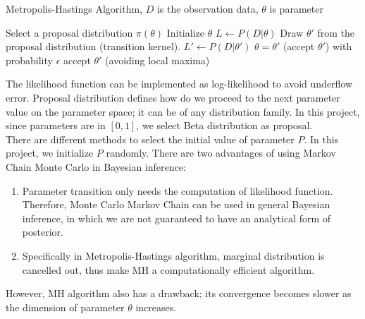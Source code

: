 \documentclass[12pt]{article}
\theoremstyle{definition}
\begin{document}
\begin{algorithm}[H]
  \caption{Metropolis-Hastings Algorithm, $D$ is the observation data, $\theta$ is parameter}\label{mhalg}
  \begin{algorithmic}[1]
    \State Select a proposal distribution $\pi(\theta)$
    \State Initialize $\theta$
    \State $L \leftarrow P(D|\theta)$
    \State Draw $\theta' $ from the proposal distribution (transition kernel).
    \State $L' \leftarrow P(D|\theta')$
    \State  $\theta = \theta'$ (accept $\theta'$)
    \Else
    \State with probability $\epsilon$ accept $\theta'$ (avoiding local maxima)
    \EndIf
    \EndWhile
    \EndProcedure
  \end{algorithmic}
\end{algorithm}
The likelihood function can be implemented as log-likelihood to avoid underflow
error. Proposal distribution defines how do we proceed to the next parameter
value on the parameter space; it can be of any distribution family. In this
project,
since parameters are in $[0,1]$, we select Beta distribution as proposal.\\
There are different methods to select the initial value of parameter $P$. In
this project, we initialize $P$ randomly. There are two advantages of using
Markov Chain Monte Carlo in Bayesian inference:
\begin{enumerate}
\item Parameter transition only needs the computation of likelihood function.
  Therefore, Monte Carlo Markov Chain can be used in general Bayesian inference,
  in which we are not guaranteed to have an analytical form of posterior.
\item Specifically in Metropolis-Hastings algorithm, marginal distribution is
  cancelled out, thus make MH a computationally efficient algorithm.
\end{enumerate}
However, MH algorithm also has a drawback; its convergence becomes slower as the
dimension of parameter $\theta$ increases.
\end{document}
